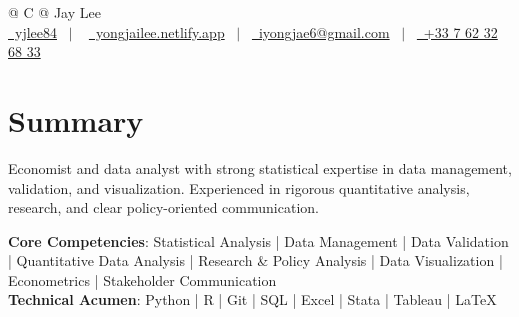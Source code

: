 \documentclass[a4paper,12pt]{article}
\begin{document}
\pagestyle{empty} 



\begin{tabularx}{\linewidth}{@{} C @{}}
\Huge{Jay Lee} \\[7.5pt]
\href{https://github.com/yjlee84}{\raisebox{-0.05\height}\faGithub\ yjlee84} \ $|$ \ 
\href{https://yongjailee.netlify.app}{\raisebox{-0.05\height}\faGlobe \ yongjailee.netlify.app} \ $|$ \ 
\href{mailto:email@mysite.com}{\raisebox{-0.05\height}\faEnvelope \ iyongjae6@gmail.com} \ $|$ \ 
\href{tel:+000000000000}{\raisebox{-0.05\height}\faMobile \ +33 7 62 32 68 33} \\
\end{tabularx}


\section{Summary}
Economist and data analyst with strong statistical expertise in data management, validation, and visualization. Experienced in rigorous quantitative analysis, research, and clear policy-oriented communication.

\textbf{Core Competencies}: Statistical Analysis | Data Management | Data Validation | Quantitative Data Analysis | Research \& Policy Analysis | Data Visualization | Econometrics | Stakeholder Communication\\
\textbf{Technical Acumen}: Python | R | Git | SQL | Excel | Stata | Tableau | \LaTeX{}
\end{document}
